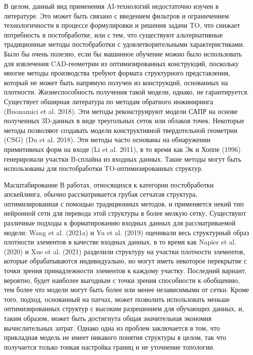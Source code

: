 В целом, данный вид применения AI-технологий недостаточно изучен в литературе. Это может быть связано с введением фильтров и ограничением технологичности в процессе формулировки и решения задачи TO, что снижает потребность в постобработке, или с тем, что существуют альтернативные традиционные методы постобработки с удовлетворительными характеристиками. Было бы очень полезно, если бы машинное обучение можно было использовать для извлечения CAD-геометрии из оптимизированных конструкций, поскольку многие методы производства требуют формата структурного представления, который не может быть напрямую получен из конструкций, основанных на плотности. Жизнеспособность получения такой модели, однако, не гарантируется. Существует обширная литература по методам обратного инжиниринга (Buonamici et al. 2018). Эти методы реконструируют модели САПР на основе полученных 3D-данных в виде треугольных сеток или облаков точек. Некоторые методы позволяют создавать модели конструктивной твердотельной геометрии (CSG) (Du et al. 2018). Эти методы часто основаны на обнаружении примитивных форм на входе (Li et al. 2011), в то время как Эк и Хоппе (1996) генерировали участки B-сплайна из входных данных. Такие методы могут быть использованы для постобработки TO-оптимизированных структур.

Масштабирование В работах, относящихся к категории постобработки апскейлинга, обычно рассматривается грубая сетчатая структура, оптимизированная с помощью традиционных методов, и применяется некий тип нейронной сети для перевода этой структуры в более мелкую сетку. Существуют различные подходы к форматированию входных данных для рассматриваемой модели: Wang et al. (2021a) и Yu et al. (2019) оценивали весь структурный образ плотности элементов в качестве входных данных, в то время как Napier et al. (2020) и Xue et al. (2021) разделили структуру на участки плотности элементов, которые обрабатываются индивидуально, но могут иметь некоторое перекрытие с точки зрения принадлежности элементов к каждому участку. Последний вариант, вероятно, будет наиболее выгодным с точки зрения способности к обобщению, тем более что модели могут быть более или менее независимыми от сетки. Кроме того, подход, основанный на патчах, может позволить использовать меньше оптимизированных структур с высоким разрешением для обучающих данных, и, таким образом, может быть достигнута общая значительная экономия вычислительных затрат. Однако одна из проблем заключается в том, что прикладная модель не имеет никакого понятия структуры в целом, так что получается только тонкая настройка границ и не уточнение топологии.

